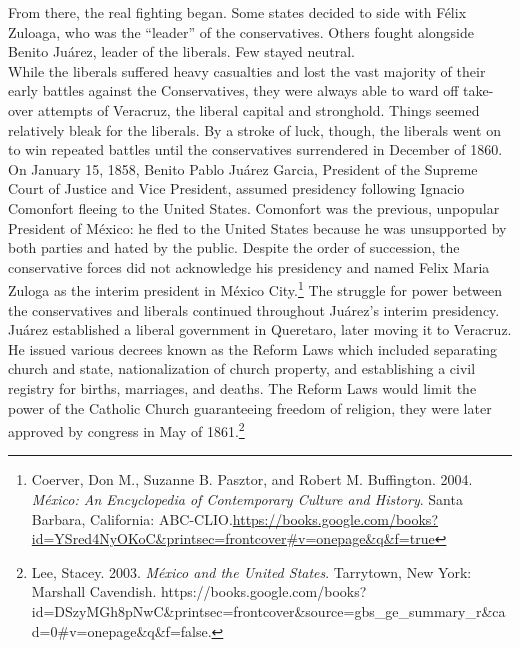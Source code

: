 \documentclass[10pt, letterpaper]{article}
\begin{document}
From there, the real fighting began. Some states decided to side with
Félix Zuloaga, who was the ``leader'' of the conservatives. Others
fought alongside Benito Juárez, leader of the liberals. Few stayed
neutral. \\

While the liberals suffered heavy casualties and lost the vast majority
of their early battles against the Conservatives, they were always able
to ward off take-over attempts of Veracruz, the liberal capital and
stronghold. Things seemed relatively bleak for the liberals. By a stroke
of luck, though, the liberals went on to win repeated battles until the
conservatives surrendered in December of 1860. \\



On January 15, 1858, Benito Pablo Juárez Garcia, President of the
Supreme Court of Justice and Vice President, assumed presidency
following Ignacio Comonfort fleeing to the United States. Comonfort was
the previous, unpopular President of México: he fled to the United
States because he was unsupported by both parties and hated by the
public. Despite the order of succession, the conservative forces did not
acknowledge his presidency and named Felix Maria Zuloga as the interim
president in México City.\footnote{Coerver, Don M., Suzanne B. Pasztor,
  and Robert M. Buffington. 2004. \emph{México: An Encyclopedia of
  Contemporary Culture and History}. Santa Barbara, California:
  ABC-CLIO.\href{https://books.google.com/books?id=YSred4NyOKoC\&printsec=frontcover\#v=onepage\&q\&f=true}{{https://books.google.com/books?id=YSred4NyOKoC\&printsec=frontcover\#v=onepage\&q\&f=true}}}
The struggle for power between the conservatives and liberals continued
throughout Juárez's interim presidency. Juárez established a liberal
government in Queretaro, later moving it to Veracruz. He issued various
decrees known as the Reform Laws which included separating church and
state, nationalization of church property, and establishing a civil
registry for births, marriages, and deaths. The Reform Laws would limit
the power of the Catholic Church guaranteeing freedom of religion, they
were later approved by congress in May of 1861.\footnote{Lee, Stacey.
  2003. \emph{México and the United States}. Tarrytown, New York:
  Marshall Cavendish.
  https://books.google.com/books?id=DSzyMGh8pNwC\&printsec=frontcover\&source=gbs\_ge\_summary\_r\&cad=0\#v=onepage\&q\&f=false.} \\
\end{document}

